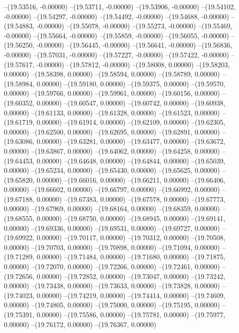 --(19.53516, -0.00000)
--(19.53711, -0.00000)
--(19.53906, -0.00000)
--(19.54102, -0.00000)
--(19.54297, -0.00000)
--(19.54492, -0.00000)
--(19.54688, -0.00000)
--(19.54883, -0.00000)
--(19.55078, -0.00000)
--(19.55273, -0.00000)
--(19.55469, -0.00000)
--(19.55664, -0.00000)
--(19.55859, -0.00000)
--(19.56055, -0.00000)
--(19.56250, -0.00000)
--(19.56445, -0.00000)
--(19.56641, -0.00000)
--(19.56836, -0.00000)
--(19.57031, -0.00000)
--(19.57227, -0.00000)
--(19.57422, -0.00000)
--(19.57617, -0.00000)
--(19.57812, -0.00000)
--(19.58008, 0.00000)
--(19.58203, 0.00000)
--(19.58398, 0.00000)
--(19.58594, 0.00000)
--(19.58789, 0.00000)
--(19.58984, 0.00000)
--(19.59180, 0.00000)
--(19.59375, 0.00000)
--(19.59570, 0.00000)
--(19.59766, 0.00000)
--(19.59961, 0.00000)
--(19.60156, 0.00000)
--(19.60352, 0.00000)
--(19.60547, 0.00000)
--(19.60742, 0.00000)
--(19.60938, 0.00000)
--(19.61133, 0.00000)
--(19.61328, 0.00000)
--(19.61523, 0.00000)
--(19.61719, 0.00000)
--(19.61914, 0.00000)
--(19.62109, 0.00000)
--(19.62305, 0.00000)
--(19.62500, 0.00000)
--(19.62695, 0.00000)
--(19.62891, 0.00000)
--(19.63086, 0.00000)
--(19.63281, 0.00000)
--(19.63477, 0.00000)
--(19.63672, 0.00000)
--(19.63867, 0.00000)
--(19.64062, 0.00000)
--(19.64258, 0.00000)
--(19.64453, 0.00000)
--(19.64648, 0.00000)
--(19.64844, 0.00000)
--(19.65039, 0.00000)
--(19.65234, 0.00000)
--(19.65430, 0.00000)
--(19.65625, 0.00000)
--(19.65820, 0.00000)
--(19.66016, 0.00000)
--(19.66211, 0.00000)
--(19.66406, 0.00000)
--(19.66602, 0.00000)
--(19.66797, 0.00000)
--(19.66992, 0.00000)
--(19.67188, 0.00000)
--(19.67383, 0.00000)
--(19.67578, 0.00000)
--(19.67773, 0.00000)
--(19.67969, 0.00000)
--(19.68164, 0.00000)
--(19.68359, 0.00000)
--(19.68555, 0.00000)
--(19.68750, 0.00000)
--(19.68945, 0.00000)
--(19.69141, 0.00000)
--(19.69336, 0.00000)
--(19.69531, 0.00000)
--(19.69727, 0.00000)
--(19.69922, 0.00000)
--(19.70117, 0.00000)
--(19.70312, 0.00000)
--(19.70508, 0.00000)
--(19.70703, 0.00000)
--(19.70898, 0.00000)
--(19.71094, 0.00000)
--(19.71289, 0.00000)
--(19.71484, 0.00000)
--(19.71680, 0.00000)
--(19.71875, 0.00000)
--(19.72070, 0.00000)
--(19.72266, 0.00000)
--(19.72461, 0.00000)
--(19.72656, 0.00000)
--(19.72852, 0.00000)
--(19.73047, 0.00000)
--(19.73242, 0.00000)
--(19.73438, 0.00000)
--(19.73633, 0.00000)
--(19.73828, 0.00000)
--(19.74023, 0.00000)
--(19.74219, 0.00000)
--(19.74414, 0.00000)
--(19.74609, 0.00000)
--(19.74805, 0.00000)
--(19.75000, 0.00000)
--(19.75195, 0.00000)
--(19.75391, 0.00000)
--(19.75586, 0.00000)
--(19.75781, 0.00000)
--(19.75977, 0.00000)
--(19.76172, 0.00000)
--(19.76367, 0.00000)
